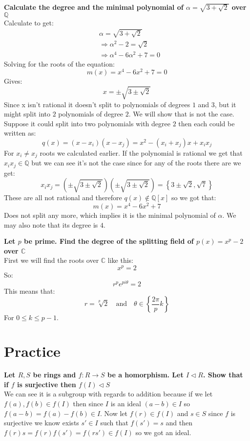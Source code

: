 \documentclass{article}
\theoremstyle{plain}
\DeclareMathOperator{\idealin}{\triangleleft}
\newcommand{\Q}{\mathbb{Q}}
\newcommand{\C}{\mathbb{C}}
\begin{document}
	\newpage
	
	\textbf{Calculate the degree and the minimal polynomial of 
	$\alpha = \sqrt{3+\sqrt{2}}$ over $\Q$} \\
	Calculate to get:
	\begin{align*}
		&\alpha = \sqrt{3+\sqrt{2}} \\ 
		&\Rightarrow \alpha^2-2 = \sqrt{2} \\
		&\Rightarrow \alpha^4-6\alpha^2+7=0
	\end{align*}
	Solving for the roots of the equation:
	\[
		m(x) = x^4-6x^2+7 = 0
	\]
	Gives:
	\[
		x = \pm\sqrt{3\pm \sqrt{2}}
	\]
	Since x isn't rational it doesn't split to polynomials of degrees $1$ and
	$3$, but it might split into $2$ polynomials of degree $2$. We will show
	that is not the case. Suppose it could split into two polynomials with
	degree $2$ then each could be written as:
	\[
		q(x) = (x-x_i)(x-x_j) = x^2 -(x_i+x_j)x + x_ix_j
	\]
	For $x_i \neq x_j$ roots we calculated earlier. If the polynomial is
	rational we get that $x_ix_j\in\Q$ but we can see it's not the case
	since for any of the roots there are we get:
	\[
		x_ix_j =
		\left(\pm\sqrt{3\pm \sqrt{2}}\right)
		\left(\pm\sqrt{3\pm \sqrt{2}}\right) = 
		\left\{
			3\pm \sqrt{2}, \sqrt{7}
		\right\}
	\]
	These are all not rational and therefore $q(x)\notin\Q[x]$ so we got that:
	\[
		\boxed{m(x) = x^4-6x^2+7}
	\]
	Does not split any more, which implies it is the minimal polynomial of
	$\alpha$. We may also note that its degree is $4$.
	
	\newpage

	\textbf{Let $p$ be prime. Find the degree of the splitting field of
	$p(x)=x^p-2$ over $\C$} \\
	First we will find the roots over $\C$ like this:
	\[
		x^p = 2
	\]
	So:
	\[
		r^pe^{pi\theta} = 2
	\]
	This means that:
	\[
		r = \sqrt[p]{2} \quad\text{and}\quad \theta \in 
		\left\{ \frac{2\pi}{p}k \right\}
	\]
	For $0 \le k \le p-1$.
	
	\newpage
	
	\section{Practice}
	
	\textbf{Let $R,S$ be rings and $f\colon R\to S$ be a homorphism. Let 
	$I\idealin R$. Show that if $f$ is surjective then $f(I)\idealin S$} \\
	We can see it is a subgroup with regards to addition because if we let
	$f(a),f(b)\in f(I)$ then since $I$ is an ideal $(a-b)\in I$ so
	$f(a-b) = f(a)-f(b)\in I$. Now let $f(r)\in f(I)$ and $s\in S$ since
	$f$ is surjective we know exists $s'\in I$ such that $f(s')=s$ and then
	$f(r)s = f(r)f(s') = f(rs')\in f(I)$ so we got an ideal.
	
\end{document}
